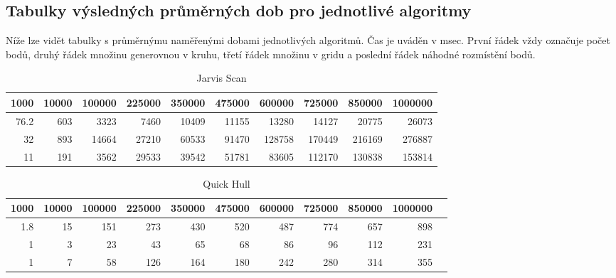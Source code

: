 \documentclass[a4paper, 12pt]{article}
\begin{document}
\clearpage
\subsection{Tabulky výsledných průměrných dob pro jednotlivé algoritmy}

Níže lze vidět tabulky s průměrnýmu naměřenými dobami jednotlivých algoritmů. Čas je uváděn v msec. První řádek vždy označuje počet bodů, druhý řádek množinu generovnou v kruhu, třetí řádek množinu v gridu a poslední řádek náhodné rozmístění bodů.


\begin{table}[h]
	\begin{tabular}{|r|r|r|r|r|r|r|r|r|r|}
	\hline
	  \textbf{1000} 	& \textbf{10000} & \textbf{100000} & \textbf{225000} & \textbf{350000} & \textbf{475000} & \textbf{600000}  & \textbf{725000}
 & \textbf{850000}  & \textbf{1000000}\\ \hline
			 76.2	& 603 	& 3323 & 7460 & 10409 & 11155 & 13280 &	14127 & 20775 & 26073 \\ \hline
	 32	& 893  	& 14664	& 27210 & 60533 & 91470 & 128758 & 170449 & 216169 & 276887 \\ \hline
	 11	& 191  	& 3562 & 29533 & 39542 & 51781 & 83605 & 112170 & 130838 & 153814	 \\ \hline

	
	\end{tabular}
		\caption{Jarvis Scan}
		
\end{table}


\begin{table}[h]
	\begin{tabular}{|r|r|r|r|r|r|r|r|r|r|r|}
	\hline
	 \textbf{1000} 	& \textbf{10000} & \textbf{100000} & \textbf{225000} & \textbf{350000} & \textbf{475000} & \textbf{600000}  & \textbf{725000}
 & \textbf{850000}  & \textbf{1000000}\\ \hline
	 1.8 & 15 & 151 &  273 & 430 & 520 & 487 & 774 & 657 & 898\\ \hline
	 1 & 3 & 23 & 43 & 65 & 68 & 86 & 96 & 112 & 231 \\ \hline
	 1 & 7 & 58 & 126 & 164 & 180 & 242 & 280 & 314 & 355	 \\ \hline

	
	\end{tabular}
		\caption{Quick Hull}
\end{table}
\end{document}
